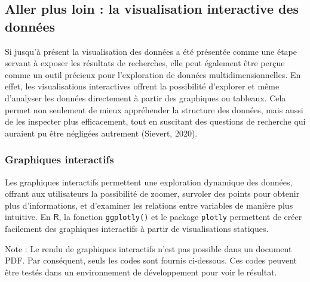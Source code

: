 \documentclass[
  letterpaper,
  DIV=11,
  numbers=noendperiod,
  oneside]{scrreprt}
\begin{document}
\hypertarget{aller-plus-loin-la-visualisation-interactive-des-donnuxe9es}{%
\subsection{Aller plus loin : la visualisation interactive des
données}\label{aller-plus-loin-la-visualisation-interactive-des-donnuxe9es}}

Si jusqu'à présent la visualisation des données a été présentée comme
une étape servant à exposer les résultats de recherches, elle peut
également être perçue comme un outil précieux pour l'exploration de
données multidimensionnelles. En effet, les visualisations interactives
offrent la possibilité d'explorer et même d'analyser les données
directement à partir des graphiques ou tableaux. Cela permet non
seulement de mieux appréhender la structure des données, mais aussi de
les inspecter plus efficacement, tout en suscitant des questions de
recherche qui auraient pu être négligées autrement (Sievert, 2020).

\hypertarget{graphiques-interactifs}{%
\subsubsection{Graphiques interactifs}\label{graphiques-interactifs}}

Les graphiques interactifs permettent une exploration dynamique des
données, offrant aux utilisateurs la possibilité de zoomer, survoler des
points pour obtenir plus d'informations, et d'examiner les relations
entre variables de manière plus intuitive. En \(\textsf{R}\), la
fonction \texttt{ggplotly()} et le package \texttt{plotly} permettent de
créer facilement des graphiques interactifs à partir de visualisations
statiques.

\begin{tcolorbox}[enhanced jigsaw, left=2mm, colback=white, arc=.35mm, bottomtitle=1mm, opacityback=0, rightrule=.15mm, coltitle=black, bottomrule=.15mm, title=\textcolor{quarto-callout-note-color}{\faInfo}\hspace{0.5em}{Note}, colframe=quarto-callout-note-color-frame, colbacktitle=quarto-callout-note-color!10!white, titlerule=0mm, toptitle=1mm, leftrule=.75mm, breakable, toprule=.15mm, opacitybacktitle=0.6]

Note : Le rendu de graphiques interactifs n'est pas possible dans un
document PDF. Par conséquent, seuls les codes sont fournis ci-dessous.
Ces codes peuvent être testés dans un environnement de développement
pour voir le résultat.

\end{tcolorbox}
\end{document}
